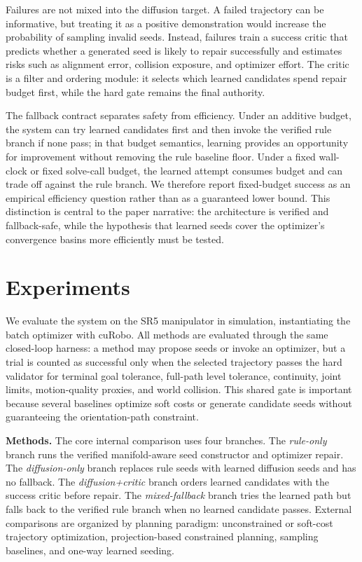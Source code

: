 \documentclass[conference]{IEEEtran/IEEEtran}
\begin{document}
Failures are not mixed into the diffusion target. A failed trajectory can be
informative, but treating it as a positive demonstration would increase the
probability of sampling invalid seeds. Instead, failures train a success critic
that predicts whether a generated seed is likely to repair successfully and
estimates risks such as alignment error, collision exposure, and optimizer
effort. The critic is a filter and ordering module: it selects which learned
candidates spend repair budget first, while the hard gate remains the final
authority.

The fallback contract separates safety from efficiency. Under an additive
budget, the system can try learned candidates first and then invoke the verified
rule branch if none pass; in that budget semantics, learning provides an
opportunity for improvement without removing the rule baseline floor. Under a
fixed wall-clock or fixed solve-call budget, the learned attempt consumes budget
and can trade off against the rule branch. We therefore report fixed-budget
success as an empirical efficiency question rather than as a guaranteed lower
bound. This distinction is central to the paper narrative: the architecture is
verified and fallback-safe, while the hypothesis that learned seeds cover the
optimizer's convergence basins more efficiently must be tested.

\section{Experiments}
\label{sec:experiments}
We evaluate the system on the SR5 manipulator in simulation, instantiating the
batch optimizer with cuRobo. All methods are evaluated through the same
closed-loop harness: a method may propose seeds or invoke an optimizer, but a
trial is counted as successful only when the selected trajectory passes the hard
validator for terminal goal tolerance, full-path level tolerance, continuity,
joint limits, motion-quality proxies, and world collision. This shared gate is
important because several baselines optimize soft costs or generate candidate
seeds without guaranteeing the orientation-path constraint.

\textbf{Methods.} The core internal comparison uses four branches. The
\emph{rule-only} branch runs the verified manifold-aware seed constructor and
optimizer repair. The \emph{diffusion-only} branch replaces rule seeds with
learned diffusion seeds and has no fallback. The \emph{diffusion+critic} branch
orders learned candidates with the success critic before repair. The
\emph{mixed-fallback} branch tries the learned path but falls back to the
verified rule branch when no learned candidate passes. External comparisons are
organized by planning paradigm: unconstrained or soft-cost trajectory
optimization, projection-based constrained planning, sampling baselines, and
one-way learned seeding.
\end{document}
